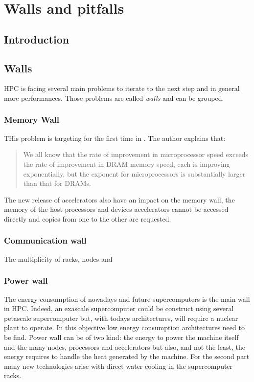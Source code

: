 \chapter{Walls and pitfalls}

\section{Introduction}

\section{Walls}

HPC is facing several main problems to iterate to the next step and in general more performances. 
Those problems are called \textit{walls} and can be grouped. 

\subsection{Memory Wall}
THis problem is targeting for the first time in \cite{wulf1995hitting}.
The author explains that:

\begin{quotation} We all know that the rate of improvement in microprocessor speed exceeds the rate of
improvement in DRAM memory speed, each is improving exponentially, but the
exponent for microprocessors is substantially larger than that for DRAMs.
\end{quotation} 

The new release of accelerators also have an impact on the memory wall, the memory of the host processors and devices accelerators cannot be accessed directly and copies from one to the other are requested.

\subsection{Communication wall} 
The multiplicity of racks, nodes and 

\subsection{Power wall}
The energy consumption of nowadays and future supercomputers is the main wall in HPC. 
Indeed, an exascale supercomputer could be construct using several petascale supercomputer but, with todays architectures, will require a nuclear plant to operate. 
In this objective low energy consumption architectures need to be find. 
Power wall can be of two kind: the energy to power the machine itself and the many nodes, processors and accelerators but also, and not the least, the energy requires to handle the heat generated by the machine. 
For the second part many new technologies arise with direct water cooling in the supercomputer racks.

